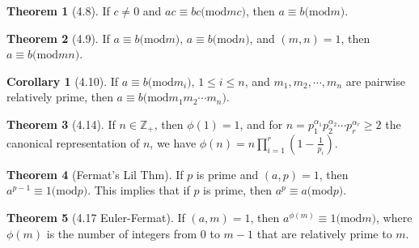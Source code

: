 \documentclass{article}
\newcommand{\Z}{\ensuremath{\mathbb{Z}}}
\renewcommand{\mod}[1]{\ensuremath{(\mathrm{mod}#1})}
\theoremstyle{definition}
\newtheorem*{cor}{Corollary}
\newtheorem*{thm}{Theorem}
\theoremstyle{remark}
\begin{document}
{        \begin{thm}[4.8]
            If $c\neq 0$ and $ac\equiv bc\mod{mc}$, then $a\equiv b\mod{m}$.
        \end{thm}
        
        \begin{thm}[4.9]
            If $a\equiv b\mod{m}$, $a\equiv b\mod{n}$, and $(m,n)=1$, then $a\equiv b\mod{mn}$.
        \end{thm}
        
        \begin{cor}[4.10]
            If $a\equiv b \mod{m_i}, \, 1\leq i\leq n$, and $m_1,m_2,\cdots,m_n$ are pairwise relatively prime, then $a\equiv b\mod{m_1m_2\cdots m_n}$.
        \end{cor}
        
        \begin{thm}[4.14]
            If $n \in \Z_+$, then $\phi(1)=1$, and for $n=p_1^{\alpha_1}p_2^{\alpha_2}\cdots p_r^{\alpha_r}\geq 2$ the canonical representation of $n$, we have $\phi(n)=n\prod_{i=1}^r(1-\frac{1}{p_i})$.
        \end{thm}
        
        \begin{thm}[Fermat's Lil Thm]
            If $p$ is prime and $(a,p)=1$, then $a^{p-1} \equiv 1\mod p$. This implies that if $p$ is prime, then $a^p \equiv a\mod{p}$.
        \end{thm}
        
        \begin{thm}[4.17 Euler-Fermat]
            If $(a,m)=1$, then $a^{\phi(m)}\equiv 1\mod{m}$, where $\phi(m)$ is the number of integers from $0$ to $m-1$ that are relatively prime to $m$.
        \end{thm}
    
    }
    
\end{document}
